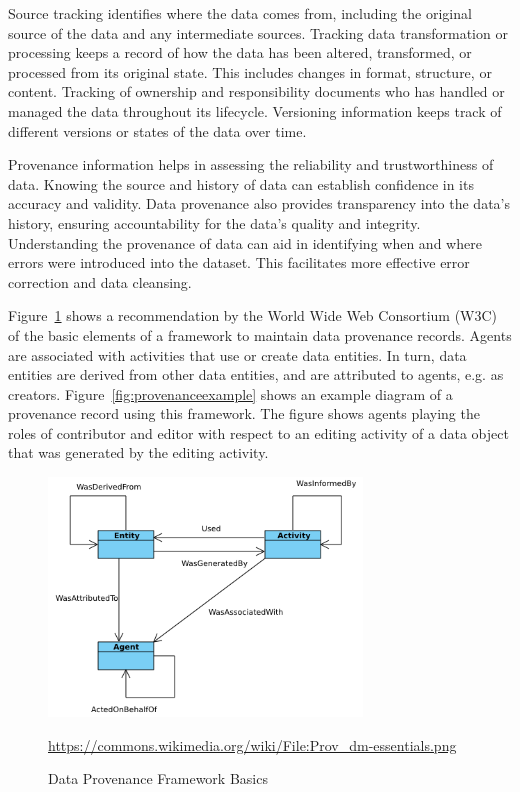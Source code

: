 Source tracking identifies where the data comes from, including the original source of the data and any intermediate sources. Tracking data transformation or processing keeps a record of how the data has been altered, transformed, or processed from its original state. This includes changes in format, structure, or content. Tracking of ownership and responsibility documents who has handled or managed the data throughout its lifecycle. Versioning information keeps track of different versions or states of the data over time.

Provenance information helps in assessing the reliability and trustworthiness of data. Knowing the source and history of data can establish confidence in its accuracy and validity. Data provenance also provides transparency into the data's history, ensuring accountability for the data's quality and integrity. Understanding the provenance of data can aid in identifying when and where errors were introduced into the dataset. This facilitates more effective error correction and data cleansing.

Figure~\ref{fig:provenancedm} shows a recommendation by the World Wide Web Consortium (W3C) of the basic elements of a framework to maintain data provenance records. Agents are associated with activities that use or create data entities. In turn, data entities are derived from other data entities, and are attributed to agents, e.g. as creators. Figure~\ref{fig:provenanceexample} shows an example diagram of a provenance record using this framework. The figure shows agents playing the roles of contributor and editor with respect to an editing activity of a data object that was generated by the editing activity. 

\begin{figure}[h]
\centering
\includegraphics[height=2.5in]{Prov_dm-essentials.png}

\scriptsize{\url{https://commons.wikimedia.org/wiki/File:Prov_dm-essentials.png}}
\caption{Data Provenance Framework Basics}
\label{fig:provenancedm}
\end{figure}


